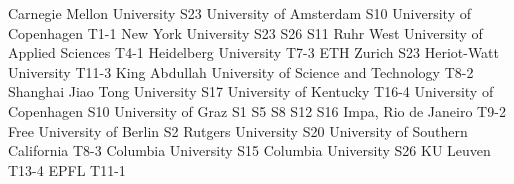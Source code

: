 \begin{multicols}{2}
{Carnegie Mellon University}
{S23}
{}
{}
{}
{}
{}
{}
{University of Amsterdam}
{S10}
{}
{}
{}
{}
{}
{}
{University of Copenhagen}
{T1-1}
{}
{}
{}
{}
{}
{}
{New York University}
{S23}
{S26}
{S11}
{}
{}
{}
{}
{Ruhr West University of Applied Sciences}
{T4-1}
{}
{}
{}
{}
{}
{}
{Heidelberg University}
{T7-3}
{}
{}
{}
{}
{}
{}
{ETH Zurich}
{S23}
{}
{}
{}
{}
{}
{}
{Heriot-Watt University}
{T11-3}
{}
{}
{}
{}
{}
{}
{King Abdullah University of Science and Technology}
{T8-2}
{}
{}
{}
{}
{}
{}
{Shanghai Jiao Tong University}
{S17}
{}
{}
{}
{}
{}
{}
{University of Kentucky}
{T16-4}
{}
{}
{}
{}
{}
{}
{University of Copenhagen}
{S10}
{}
{}
{}
{}
{}
{}
{University of Graz}
{S1}
{S5}
{S8}
{S12}
{S16}
{}
{}
{Impa, Rio de Janeiro}
{T9-2}
{}
{}
{}
{}
{}
{}
{Free University of Berlin}
{S2}
{}
{}
{}
{}
{}
{}
{Rutgers University}
{S20}
{}
{}
{}
{}
{}
{}
{University of Southern California}
{T8-3}
{}
{}
{}
{}
{}
{}
{Columbia University}
{S15}
{}
{}
{}
{}
{}
{}
{Columbia University}
{S26}
{}
{}
{}
{}
{}
{}
{KU Leuven}
{T13-4}
{}
{}
{}
{}
{}
{}
{EPFL}
{T11-1}
{}
{}
{}
{}
{}
{}
\end{multicols}

